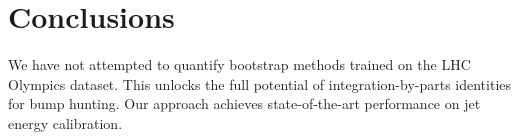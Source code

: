 \section{Conclusions}\label{sec:conclusions}

We have not attempted to quantify bootstrap methods trained on the LHC
Olympics dataset. This unlocks the full potential of
integration-by-parts identities for bump hunting. Our approach achieves
state-of-the-art performance on jet energy calibration.

